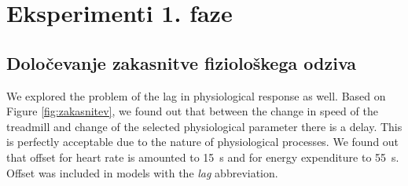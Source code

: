 \section{Eksperimenti 1. faze}

\subsection{Določevanje zakasnitve fiziološkega odziva}

We explored the problem of the lag in physiological response as well. Based on Figure \ref{fig:zakasnitev}, we found out that between the change in speed of the treadmill and change of the selected physiological parameter there is a delay. This is perfectly acceptable due to the nature of physiological processes. We found out that offset for heart rate is amounted to \SI{15}{\s} and for energy expenditure to \SI{55}{\s}. Offset was included in models with the \textit{lag} abbreviation.

